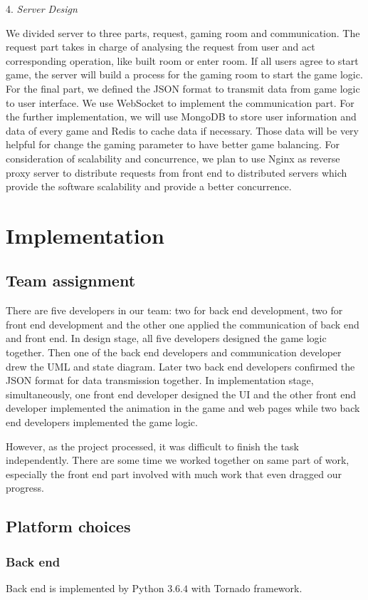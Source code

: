 \documentclass[a4paper,11pt]{article}
\begin{document}
4.	\emph{Server Design}

We divided server to three parts, request, gaming room and communication. The request part takes in charge of analysing the request from user and act corresponding operation, like built room or enter room. If all users agree to start game, the server will build a process for the gaming room to start the game logic. For the final part, we defined the JSON format to transmit data from game logic to user interface. We use WebSocket to implement the communication part. For the further implementation, we will use MongoDB to store user information and data of every game and Redis to cache data if necessary. Those data will be very helpful for change the gaming parameter to have better game balancing. For consideration of scalability and concurrence, we plan to use Nginx as reverse proxy server to distribute requests from front end to distributed servers which provide the software scalability and provide a better concurrence.

\section{Implementation}
\subsection{Team assignment}
There are five developers in our team: two for back end development, two for front end development and the other one applied the communication of back end and front end. In design stage, all five developers designed the game logic together. Then one of the back end developers and communication developer drew the UML and state diagram. Later two back end developers confirmed the JSON format for data transmission together. In implementation stage, simultaneously, one front end developer designed the UI and the other front end developer implemented the animation in the game and web pages while two back end developers implemented the game logic.

However, as the project processed, it was difficult to finish the task independently. There are some time we worked together on same part of work, especially the front end part involved with much work that even dragged our progress. 

\subsection{Platform choices}
\subsubsection{Back end}
 Back end is implemented by Python $3.6.4$ with Tornado framework.
 
\end{document}
